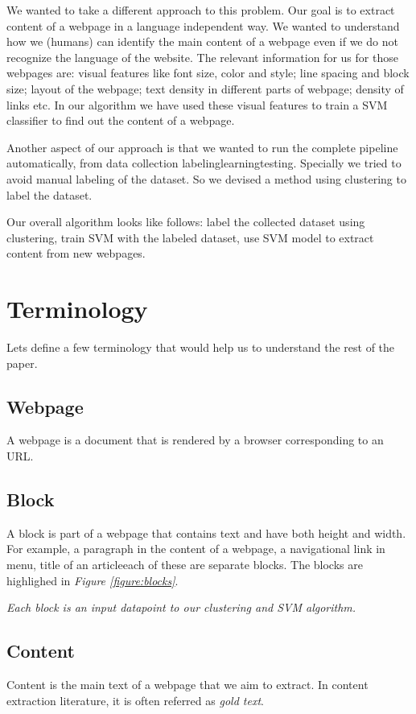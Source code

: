 \documentclass{acm_proc_article-sp}
\begin{document}
We wanted to take a different approach to this problem. Our goal is to extract content of a webpage in a language independent way. We wanted to understand how we (humans) can identify the main content of a webpage even if we do not recognize the language of the website. The relevant information for us for those webpages are: visual features like font size, color and style; line spacing and block size; layout of the webpage; text density in different parts of webpage; density of links etc. In our algorithm we have used these visual features to train a SVM classifier to find out the content of a webpage.

Another aspect of our approach is that we wanted to run the complete pipeline automatically, from data collection \textemdash labeling\textemdash learning\textemdash testing. Specially we tried to avoid manual labeling of the dataset. So we devised a method using clustering to label the dataset.

Our overall algorithm looks like follows: label the collected dataset using clustering, train SVM with the labeled dataset, use SVM model to extract content from new webpages.

\section{Terminology}
Lets define a few terminology that would help us to understand the rest of the paper.
\subsection{Webpage}
A webpage is a document that is rendered by a browser corresponding to an URL.
\subsection{Block}
\label{subsec:block}
A block is part of a webpage that contains text and have both height and width. For example, a paragraph in the content of a webpage, a navigational link in menu, title of an article\textemdash each of these are separate blocks. The blocks are highlighed in \emph{Figure \ref{figure:blocks}}.

\emph{Each block is an input datapoint to our clustering and SVM algorithm.}

\subsection{Content}
Content is the main text of a webpage that we aim to extract. In content extraction literature, it is often referred as \emph{gold text}.
\end{document}
